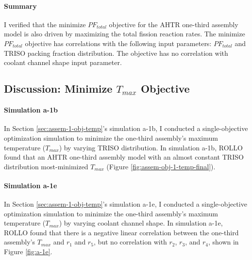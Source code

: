 \paragraph{Summary}
I verified that the minimize $PF_{total}$ objective for the \gls{AHTR} one-third assembly 
model is also driven by maximizing the total fission reaction rates. 
The minimize $PF_{total}$ objective has correlations with the following input parameters: 
$PF_{total}$ and TRISO packing fraction distribution. 
The objective has no correlation with coolant channel shape input parameter. 

\subsection{Discussion: Minimize $T_{max}$ Objective}
\label{sec:assem-discussion-temp}
\paragraph{Simulation a-1b}
In Section \ref{sec:assem-1-obj-temp}'s simulation a-1b, I conducted a single-objective 
optimization simulation to minimize the one-third assembly's maximum temperature 
($T_{max}$) by varying TRISO distribution. 
In simulation a-1b, \gls{ROLLO} found that an \gls{AHTR} one-third assembly model with 
an almost constant TRISO distribution most-minimized $T_{max}$ 
(Figure \ref{fig:assem-obj-1-temp-final}).

\paragraph{Simulation a-1e}
In Section \ref{sec:assem-1-obj-temp}'s simulation a-1e, I conducted a single-objective 
optimization simulation to minimize the one-third assembly's maximum temperature 
($T_{max}$) by varying coolant channel shape. 
In simulation a-1e, \gls{ROLLO} found that there is a negative linear correlation 
between the one-third assembly's $T_{max}$ and $r_1$ and $r_5$, but no correlation with 
$r_2$, $r_3$, and $r_4$, shown in Figure \ref{fig:a-1e}. 

